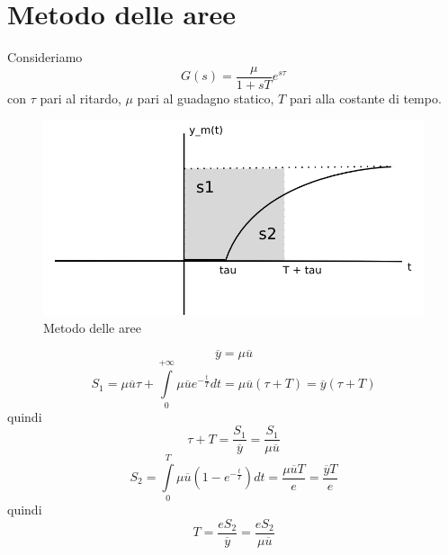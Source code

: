 \documentclass[a4paper]{report}
\begin{document}
\section{Metodo delle aree}
Consideriamo
\[
G(s) = \dfrac{\mu}{1 + sT} e^{s \tau}
\]
con $\tau$ pari al ritardo, $\mu$ pari al guadagno statico, $T$ pari
alla costante di tempo.
\begin{figure}[!h]
  \begin{center}
    \includegraphics[scale=0.4]{./images/metodoDelleAree}
    \caption{Metodo delle aree}
    \label{fig:metodoDelleAree}
  \end{center}
\end{figure}
\[
\overline{y} = \mu \overline{u}
\]
\[
S_1 = \mu \overline{u} \tau + \int\limits_{0}^{+ \infty} \mu
\overline{u}e^{-\frac{t}{T}} dt = \mu \overline{u}(\tau + T) =
\overline{y}(\tau + T)
\]
quindi
\[
\tau + T = \dfrac{S_1}{\overline{y}} = \dfrac{S_1}{\mu \overline{u}}
\]
\[
S_2 = \int\limits_{0}^{T} \mu \overline{u} (1 - e^{- \frac{t}{T}}) dt
= \dfrac{\mu \overline{u} T}{e} = \dfrac{\overline{y} T}{e}
\]
quindi
\[
T = \dfrac{e S_2}{\overline{y}} = \dfrac{e S_2}{\mu \overline{u}}
\]
\end{document}
